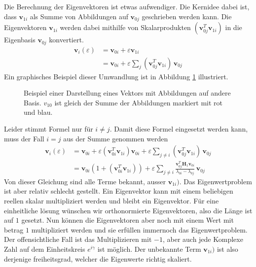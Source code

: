 Die Berechnung der Eigenvektoren ist etwas aufwendiger.
Die Kernidee dabei ist, dass $\bm v_{1i}$ als Summe von Abbildungen auf $\bm v_{0j}$ geschrieben werden kann.
Die Eigenvektoren $\bm v_{1i}$ werden dabei mithilfe von Skalarprodukten $( \bm v_{0j}^T \bm v_{1i})$ in die Eigenbasis $\bm v_{0j}$ konvertiert. %
\begin{align*}
    \bm v_i(\varepsilon)
    &=
    \bm v_{0i} + \varepsilon \bm v_{1i} \\
    &=
    \bm v_{0i} + \varepsilon \sum_{j} ( \bm v_{0j}^T \bm v_{1i}) \, \bm v_{0j}
\end{align*}
Ein graphisches Beispiel dieser Umwandlung ist in Abbildung \ref{ew:fig:scalar_prod} illustriert.
\begin{figure}
    \begin{center}
        
    \end{center}
    \caption[Eigenräume]{
        Beispiel einer Darstellung eines Vektors mit Abbildungen auf andere Basis.
        $v_{10}$ ist gleich der Summe der Abbildungen markiert mit rot und blau.
    } \label{ew:fig:scalar_prod}
\end{figure}
Leider stimmt Formel  nur für $i \neq j$. Damit diese Formel eingesetzt werden kann, muss der Fall $i = j$ aus der Summe genommen werden
\begin{align}
    \bm v_i(\varepsilon)
    &=
    \bm v_{0i} + \varepsilon ( \bm v_{0i}^T \bm v_{1i}) \bm v_{0i} + \varepsilon \sum_{j \neq i} (\bm v_{0j}^T \bm v_{1i}) \, \bm v_{0j} \\
    &=
    \bm v_{0i} ( 1 + (\bm v_{0i}^T \bm v_{1i}) ) + \varepsilon \sum_{j \neq i}
    \frac{\bm v_{0j}^T \bm H_1 \bm v_{0i}}{\lambda_{0i} - \lambda_{0j}}
    \, \bm v_{0j} \label{ew:ew:calc_eigv}
\end{align}
Von dieser Gleichung sind alle Terme bekannt, ausser $\bm v_{1i})$.
Das Eigenwertproblem ist aber relativ schlecht gestellt.
Ein Eigenvektor kann mit einem beliebigen reellen skalar multipliziert werden und bleibt ein Eigenvektor.
Für eine einheitliche lösung wünschen wir orthonormierte Eigenvektoren, also die Länge ist auf $1$ gesetzt.
Nun können die Eigenvektoren aber noch mit einem Wert mit betrag $1$ multipliziert werden und sie erfüllen immernoch das Eigenwertproblem.
Der offensichtliche Fall ist das Multiplizieren mit $-1$, aber auch jede Komplexe Zahl auf dem Einheitskreis $e^{i\gamma}$ ist möglich.
Der unbekannte Term $\bm v_{1i})$ ist also derjenige freiheitsgrad, welcher die Eigenwerte richtig skaliert.
